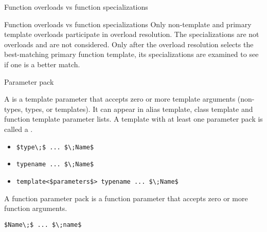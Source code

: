 \begin{frame}{Function overloads vs function specializations}{}
  \begin{block}{Function overloads vs function specializations}
    Only non-template and primary template overloads participate in overload resolution. The specializations are not overloads and are not considered. Only after the overload resolution selects the best-matching primary function template, its specializations are examined to see if one is a better match.
  \end{block}

  \begin{example}
  \end{example}
\end{frame}


\begin{frame}{Parameter pack}{}
  \begin{definition}
    A  is a template parameter that accepts zero or more template arguments (non-types, types, or templates).
    It can appear in alias template, class template and function template parameter lists.
    A template with at least one parameter pack is called a .
    \begin{itemize}
    \item
      \lstinline[mathescape]!$type\;$ ... $\;Name$!
    \item
      \lstinline[mathescape]!typename ... $\;Name$!
    \item
      \lstinline[mathescape]!template<$parameters$> typename ... $\;Name$!
    \end{itemize}
  \end{definition}

  \begin{definition}
    A function parameter pack is a function parameter that accepts zero or more function arguments.
    \begin{center}
      \lstinline[mathescape]!$Name\;$ ... $\;name$!
    \end{center}
  \end{definition}
\end{frame}

